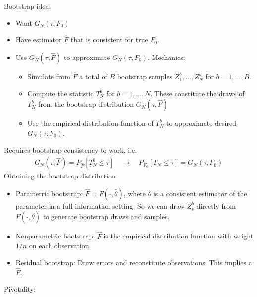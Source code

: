 \documentclass[12pt]{article}
\theoremstyle{plain}
\theoremstyle{definition}
\theoremstyle{remark}
\newcommand{\ra}{\rightarrow}
\begin{document}
\clearpage
Bootstrap idea:
\begin{itemize}
  \item Want $G_N(\tau,F_0)$
  \item Have estimator $\hat{F}$ that is consistent for true $F_0$.
  \item Use $G_N(\tau,\hat{F})$ to approximate $G_N(\tau,F_0)$.
    Mechanics:
    \begin{itemize}
      \item Simulate from $\hat{F}$ a total of $B$ bootstrap samples
        $Z_1^b,\ldots,Z_N^b$ for $b=1,\ldots,B$.
      \item Compute the statistic $T^b_N$ for $b=1,\ldots,N$.
        These constitute the draws of $T_N^b$ from the bootstrap
        distribution $G_N(\tau,\hat{F})$
      \item Use the empirical distribution function of $T^b_N$ to
        approximate desired $G_N(\tau,F_0)$.
    \end{itemize}
\end{itemize}
Requires bootstrap consistency to work, i.e.
\begin{align*}
  G_N(\tau,\hat{F})
  =
  P_{\hat{F}}[T_N^b\leq \tau]
  \quad\ra\quad
  P_{F_0}[T_N\leq \tau]
  =
  G_N(\tau,F_0)
\end{align*}
Obtaining the bootstrap distribution
\begin{itemize}
  \item Parametric bootstrap:
    $\hat{F}=F(\cdot,\hat{\theta})$, where $\hat{\theta}$ is a
    consistent estimator of the parameter in a full-information setting.
    So we can draw $Z_i^b$ directly from $F(\cdot,\hat{\theta})$ to
    generate bootstrap draws and samples.
  \item
    Nonparametric bootstrap:
    $\hat{F}$ is the empirical distribution function with weight $1/n$
    on each observation.
  \item
    Residual bootstrap:
    Draw errors and reconstitute observations.
    This implies a $\hat{F}$.
\end{itemize}
\clearpage
Pivotality:
\end{document}

